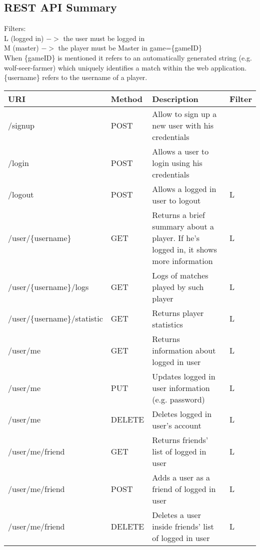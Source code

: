 \subsection{REST API Summary}

Filters: \\
L (logged in) $->$ the user must be logged in\\
M (master) $->$ the player must be Master in game=\{gameID\} \\
When \{gameID\} is mentioned it refers to an automatically generated string (e.g. wolf-seer-farmer) which uniquely identifies a match within the web application.
\{username\} refers to the username of a player.
\begin{longtable}{|p{}|p{} |p{}|p{}|} 
\hline
\textbf{URI} & \textbf{Method} & \textbf{Description} & \textbf{Filter} \\\hline
/signup & POST & Allow to sign up a new user with his credentials & \\\hline
/login & POST & Allows a user to login using his credentials & \\\hline
/logout & POST & Allows a logged in user to logout & L \\\hline
/user/\{username\} & GET & Returns a brief summary about a player. If he's logged in, it shows more information & L \\\hline
/user/\{username\}/logs & GET & Logs of matches played by such player & L \\\hline
/user/\{username\}/statistic & GET & Returns player statistics & L\\\hline

/user/me & GET & Returns information about logged in user & L \\\hline
/user/me & PUT & Updates logged in user information (e.g. password) & L \\\hline
/user/me & DELETE & Deletes logged in user's account & L \\\hline
/user/me/friend & GET & Returns friends' list of logged in user & L \\\hline
/user/me/friend & POST & Adds a user as a friend of logged in user & L \\\hline
/user/me/friend & DELETE & Deletes a user inside friends' list of logged in user & L \\\hline


\end{longtable}
